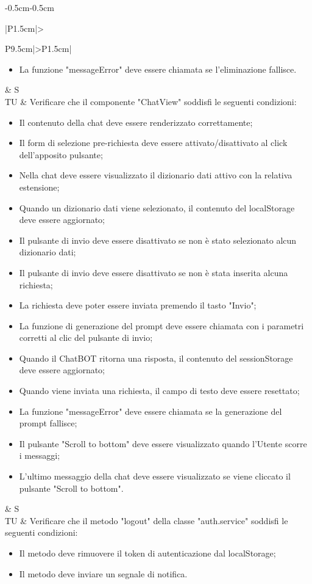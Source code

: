 \begin{adjustwidth}{-0.5cm}{-0.5cm}
\begin{longtable}{|P{1.5cm}|>{\raggedright}P{9.5cm}|>{\arraybackslash}P{1.5cm}|}
\begin{itemize}
			\item La funzione "messageError" deve essere chiamata se l'eliminazione fallisce.
    \end{itemize} & S \\
		\hline TU & Verificare che il componente "ChatView" soddisfi le seguenti condizioni:
    \begin{itemize}
      \item Il contenuto della chat deve essere renderizzato correttamente;
			\item Il form di selezione pre-richiesta deve essere attivato/disattivato al click dell'apposito pulsante;
			\item Nella chat deve essere visualizzato il dizionario dati attivo con la relativa estensione;
			\item Quando un dizionario dati viene selezionato, il contenuto del localStorage deve essere aggiornato;
			\item Il pulsante di invio deve essere disattivato se non è stato selezionato alcun dizionario dati;
			\item Il pulsante di invio deve essere disattivato se non è stata inserita alcuna richiesta;
			\item La richiesta deve poter essere inviata premendo il tasto "Invio";
			\item La funzione di generazione del prompt deve essere chiamata con i parametri corretti al clic del pulsante di invio;
			\item Quando il ChatBOT ritorna una risposta, il contenuto del sessionStorage deve essere aggiornato;
			\item Quando viene inviata una richiesta, il campo di testo deve essere resettato;
			\item La funzione "messageError" deve essere chiamata se la generazione del prompt fallisce;
			\item Il pulsante "Scroll to bottom" deve essere visualizzato quando l'Utente scorre i messaggi;
			\item L'ultimo messaggio della chat deve essere visualizzato se viene cliccato il pulsante "Scroll to bottom".
    \end{itemize} & S \\
		\hline TU & Verificare che il metodo "logout" della classe "auth.service" soddisfi le seguenti condizioni:
		\begin{itemize}
			\item Il metodo deve rimuovere il token di autenticazione dal localStorage;
			\item Il metodo deve inviare un segnale di notifica.

\end{itemize}
\end{longtable}
\end{adjustwidth}
